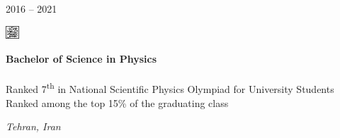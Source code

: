 \documentclass[9pt, purple]{./template/cv} %
\begin{document}
\begin{minipage}{\linewidth}
    \vspace{0.5cm}
    \begin{minipage}[t]{0.15\linewidth}
        \vspace{-\baselineskip}
        \textcolor{soft}{2016 -- 2021} 
    \end{minipage}
    \begin{minipage}[t]{8mm}
        \vspace{-\baselineskip}
        \includegraphics[width=5mm]{img/sbu}\centering
    \end{minipage}
    \begin{minipage}[t]{0.64\linewidth}
        \vspace{-\baselineskip}
        {\textcolor{accentbackground}{\textbf{Bachelor of Science in Physics}}} \\
        \\
        \textcolor{accentbackground}{\faTrophy} Ranked 7\textsuperscript{th} in National Scientific Physics Olympiad for University Students \\
        \textcolor{accentbackground}{\faGraduationCap} Ranked among the top 15\% of the graduating class
    \end{minipage}
    \hfill
    \begin{minipage}{0.1\linewidth}
        \textcolor{accentbackground}{\textit{Tehran, Iran}} 
    \end{minipage}
\end{minipage}
\vspace{-0.5cm}
% 
	
	
	
% 
\end{document}
